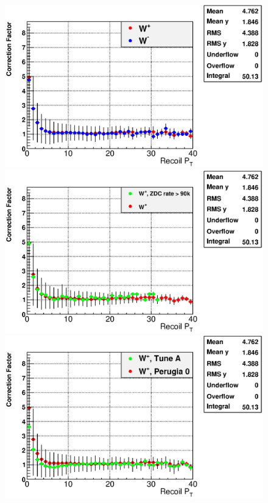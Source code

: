 \documentclass[12pt]{article}
\begin{document}
\begin{figure}[htbp]
\begin{center}
\includegraphics[scale=0.43]{images/plot_PtCorrFactor_ProfileX}
\includegraphics[scale=0.43]{images/plot_PtCorrFactor_ZDChigh_ProfileX}
\includegraphics[scale=0.43]{images/plot_PtCorrFactor_TuneA_ProfileX}

\end{center}
\end{figure}
\end{document}
